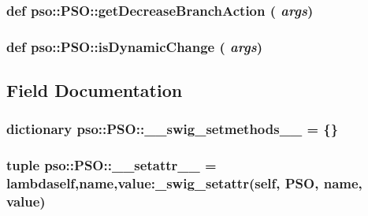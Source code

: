 \hypertarget{classpso_1_1PSO_ca04d22cce6f040c71fa7df3ac3e46d4}{
\subsubsection{\setlength{\rightskip}{0pt plus 5cm}def pso::PSO::getDecreaseBranchAction ( {\em args})}}
\label{classpso_1_1PSO_ca04d22cce6f040c71fa7df3ac3e46d4}


\hypertarget{classpso_1_1PSO_417c0009e4dc2b3d8a73454d1eb4423b}{
\subsubsection{\setlength{\rightskip}{0pt plus 5cm}def pso::PSO::isDynamicChange ( {\em args})}}
\label{classpso_1_1PSO_417c0009e4dc2b3d8a73454d1eb4423b}




\subsection{Field Documentation}
\hypertarget{classpso_1_1PSO_9b9529b86719f29355bd164b670caee9}{
\subsubsection{\setlength{\rightskip}{0pt plus 5cm}dictionary {\bf pso::PSO::\_\-\_\-swig\_\-setmethods\_\-\_\-} = \{\}}}
\label{classpso_1_1PSO_9b9529b86719f29355bd164b670caee9}


\hypertarget{classpso_1_1PSO_b930bfec249a4f55df08ab0185e000a5}{
\subsubsection{\setlength{\rightskip}{0pt plus 5cm}tuple {\bf pso::PSO::\_\-\_\-setattr\_\-\_\-} = lambdaself,name,value:\_\-swig\_\-setattr(self, {\bf PSO}, name, value)}}
\label{classpso_1_1PSO_b930bfec249a4f55df08ab0185e000a5}


